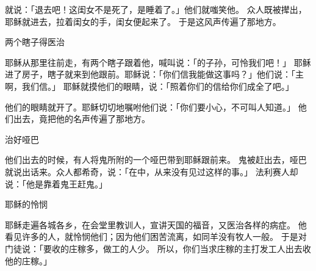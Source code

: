 {就说：「退去吧！这闺女不是死了，是睡着了。」他们就嗤笑他。
众人既被撵出，耶稣就进去，拉着闺女的手，闺女便起来了。
于是这风声传遍了那地方。
\par }{\SH 两个瞎子得医治
\par }{\PP {}耶稣从那里往前走，有两个瞎子跟着他，喊叫说：「{}的子孙，可怜我们吧！」
耶稣进了房子，瞎子就来到他跟前。耶稣说：「你们信我能做这事吗？」他们说：「主啊，我们信。」
耶稣就摸他们的眼睛，说：「照着你们的信给你们成全了吧。」
\par }{\PP {}他们的眼睛就开了。耶稣切切地嘱咐他们说：「你们要小心，不可叫人知道。」
他们出去，竟把他的名声传遍了那地方。
\par }{\SH 治好哑巴
\par }{\PP {}他们出去的时候，有人将鬼所附的一个哑巴带到耶稣跟前来。
鬼被赶出去，哑巴就说出话来。众人都希奇，说：「在{}中，从来没有见过这样的事。」
法利赛人却说：「他是靠着鬼王赶鬼。」
\par }{\SH 耶稣的怜悯
\par }{\PP {}耶稣走遍各城各乡，在会堂里教训人，宣讲天国的福音，又医治各样的病症。
他看见许多的人，就怜悯他们；因为他们困苦流离，如同羊没有牧人一般。
于是对门徒说：「要收的庄稼多，做工的人少。
所以，你们当求庄稼的主打发工人出去收他的庄稼。」

}
